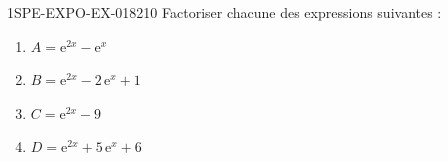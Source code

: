 \begin{exercice}{1SPE-EXPO-EX-018}{2}{10}
Factoriser chacune des expressions suivantes :
\begin{enumerate}
  \item $A = \mathrm{e}^{2x} - \mathrm{e}^x$
  \item $B = \mathrm{e}^{2x} - 2\,\mathrm{e}^x + 1$
  \item $C = \mathrm{e}^{2x} - 9$
  \item $D = \mathrm{e}^{2x} + 5\,\mathrm{e}^x + 6$
\end{enumerate}
\end{exercice}
